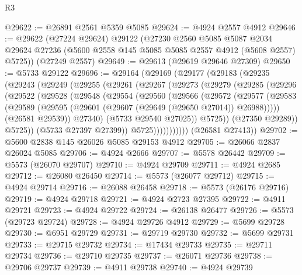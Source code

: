 \begin{lexlean}{R3}
\begin{coremodule}
@29622 := @26891 @2561 @5359 @5085
@29624 := @4924 @2557 @4912
@29646 := @29622
    (@27224 @29624)
    @29122
    (@27230
      @2560
      @5085
      @5087
      @2034
      @29624
      @27236
      (@5600 @2558 @145 @5085 @5085 @2557 @4912 (@5608 @2557) @5725))
    (@27249 @2557)
@29649 := @29613 (@29619 @29646 @27309)
@29650 := @5733 @29122
@29696 := @29164
    (@29169
      (@29177
        (@29183
          (@29235
            (@29243
              (@29249
                (@29255
                  (@29261
                    (@29267
                      (@29273
                        (@29279
                          (@29285
                            (@29296
                              (@29522
                                (@29528
                                  (@29548
                                    (@29554
                                      (@29560
                                        (@29566
                                          (@29572
                                            (@29577
                                              (@29583
                                                (@29589
                                                  (@29595
                                                    (@29601
                                                      (@29607 (@29649 (@29650 @27014)) @26988)))))
                                              (@26581 @29539))
                                            @27340)
                                          (@5733 @29540 @27025))
                                        @5725))
                                    (@27350 @29289))
                                  @5725))
                              (@5733 @27397 @27399))
                            @5725)))))))))))
      (@26581 @27413))
@29702 := @5600 @2838 @145 @26026 @5085 @29153 @4912
@29705 := @26066 @2837 @26024 @5085
@29706 := @4924 @2666
@29707 := @5578 @26442
@29709 := @5573 (@26070 @29707)
@29710 := @4924 @29709
@29711 := @4924 @2685
@29712 := @26080 @26450
@29714 := @5573 (@26077 @29712)
@29715 := @4924 @29714
@29716 := @26088 @26458
@29718 := @5573 (@26176 @29716)
@29719 := @4924 @29718
@29721 := @4924 @2723 @27395
@29722 := @4911 @29721
@29723 := @4924 @29722
@29724 := @26138 @26477
@29726 := @5573 (@29723 @29724)
@29728 := @4924 @29726 @4912
@29729 := @5699 @29728
@29730 := @6951 @29729
@29731 := @29719 @29730
@29732 := @5699 @29731
@29733 := @29715 @29732
@29734 := @17434 @29733
@29735 := @29711 @29734
@29736 := @29710 @29735
@29737 := @26071 @29736
@29738 := @29706 @29737
@29739 := @4911 @29738
@29740 := @4924 @29739

\end{coremodule}
\end{lexlean}
